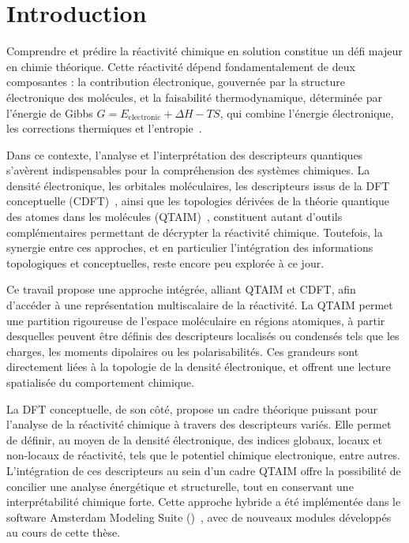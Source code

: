 \chapter{Introduction}

Comprendre et prédire la réactivité chimique en solution constitue un défi
majeur en chimie théorique. Cette réactivité dépend fondamentalement de deux
composantes : la contribution électronique, gouvernée par la structure
électronique des molécules, et la faisabilité thermodynamique, déterminée par
l'énergie de Gibbs $G = E_{\mathrm{electronic}} + \Delta H - TS$, qui combine
l'énergie électronique, les corrections thermiques et
l'entropie~\cite{scmGibbs2025}.

Dans ce contexte, l'analyse et l'interprétation des descripteurs quantiques
s'avèrent indispensables pour la compréhension des systèmes chimiques.  La
densité électronique, les orbitales moléculaires, les descripteurs issus de la
DFT conceptuelle (\gls{CDFT})~\cite{Parr1995}, ainsi que les topologies
dérivées de la théorie quantique des atomes dans les molécules
(\gls{QTAIM})~\cite{bader}, constituent autant d'outils complémentaires
permettant de décrypter la réactivité chimique.  Toutefois, la synergie entre
ces approches, et en particulier l'intégration des informations topologiques et
conceptuelles, reste encore peu explorée à ce jour.

Ce travail propose une approche intégrée, alliant QTAIM et CDFT, afin d'accéder
à une représentation multiscalaire de la réactivité. La QTAIM permet une
partition rigoureuse de l'espace moléculaire en régions atomiques, à partir
desquelles peuvent être définis des descripteurs localisés ou condensés tels
que les charges, les moments dipolaires ou les polarisabilités. Ces grandeurs
sont directement liées à la topologie de la densité électronique, et offrent
une lecture spatialisée du comportement chimique.

\newpage
La DFT conceptuelle, de son côté, propose un cadre théorique puissant pour
l'analyse de la réactivité chimique à travers des descripteurs variés. Elle
permet de définir, au moyen de la densité électronique, des indices globaux,
locaux et non-locaux de réactivité, tels que le potentiel chimique electronique,
entre autres. L'intégration de ces descripteurs au sein d'un cadre
\gls{QTAIM} offre la possibilité de concilier une analyse énergétique et structurelle,
tout en conservant une interprétabilité chimique forte. Cette approche hybride
a été implémentée dans le software Amsterdam Modeling Suite
(\ams)~\cite{ADF2001}, avec de nouveaux modules développés au cours de cette
thèse.

